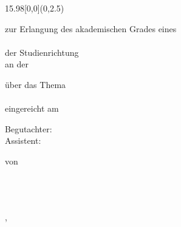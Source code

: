 \begin{titlepage}
\thispagestyle{empty}  %
\large  %

\begin{textblock}{15.98}[0,0](0,2.5)
\centering
\Large{\textsf{\myworktitle}}

\vfill

\textsf{zur Erlangung des akademischen Grades eines}\\[5mm]
\Large\textsf{\mygrade}\\[5mm]
\textsf{der Studienrichtung \mystudy}\\
\textsf{an der \myuniversity}

\vfill

\textsf{über das Thema}\\[10mm]

\LARGE{\textsf{\mytitle}}\\[10mm]


\Large
\textsf{eingereicht am}\\
\textsf{\myinstitute}

\textsf{Begutachter: \mysupervisor}\\
\textsf{Assistent: \myassistant}

\textsf{von}\\[5mm]
\Large{\textsf{\myauthor}}\\[5mm]
\textsf{\myhomestreet}\\
\textsf{\myhomepostalnumber~\myhometown}

\vfill

\textsf{\mysubmissiontown, \mysubmissionmonth~\mysubmissionyear}

\end{textblock}
\normalsize %

\newpage
{}

{}
\null\newpage
\cleardoublepage
\end{titlepage}

